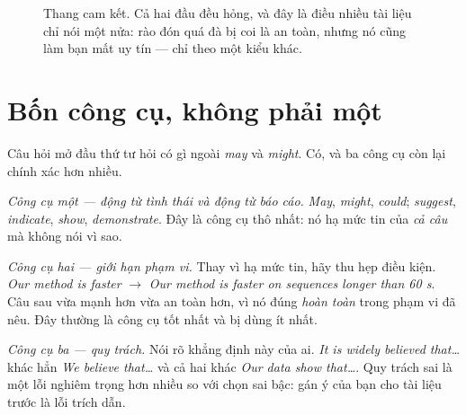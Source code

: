 \documentclass[../../english.tex]{subfiles}
\begin{document}
\begin{figure}[H]\centering
{}
\caption{Thang cam kết. Cả hai đầu đều hỏng, và đây là điều nhiều tài liệu chỉ nói một nửa: rào đón quá đà bị coi là an toàn, nhưng nó cũng làm bạn mất uy tín --- chỉ theo một kiểu khác.}
\label{fig:thang-cam-ket-viet}
\end{figure}

\section{Bốn công cụ, không phải một}

Câu hỏi mở đầu thứ tư hỏi có gì ngoài \emph{may} và \emph{might}. Có, và ba công cụ còn lại chính xác hơn nhiều.

\emph{Công cụ một --- động từ tình thái và động từ báo cáo.} \emph{May}, \emph{might}, \emph{could}; \emph{suggest}, \emph{indicate}, \emph{show}, \emph{demonstrate}. Đây là công cụ thô nhất: nó hạ mức tin của \emph{cả câu} mà không nói vì sao.

\emph{Công cụ hai --- giới hạn phạm vi.} Thay vì hạ mức tin, hãy thu hẹp điều kiện. \emph{Our method is faster} \(\rightarrow\) \emph{Our method is faster on sequences longer than 60 s}. Câu sau vừa mạnh hơn vừa an toàn hơn, vì nó đúng \emph{hoàn toàn} trong phạm vi đã nêu. Đây thường là công cụ tốt nhất và bị dùng ít nhất.

\emph{Công cụ ba --- quy trách.} Nói rõ khẳng định này của ai. \emph{It is widely believed that\ldots} khác hẳn \emph{We believe that\ldots} và cả hai khác \emph{Our data show that\ldots}. Quy trách sai là một lỗi nghiêm trọng hơn nhiều so với chọn sai bậc: gán ý của bạn cho tài liệu trước là lỗi trích dẫn.
\end{document}
